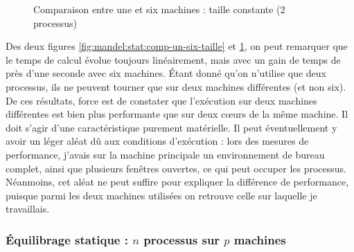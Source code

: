 \begin{figure}
  \centering


  \caption{Comparaison entre une et six machines : taille
    constante (2 processus)}
  \label{fig:mandel:stat:comp-un-six-prof}
\end{figure}

Des deux figures \ref{fig:mandel:stat:comp-un-six-taille} et
\ref{fig:mandel:stat:comp-un-six-prof}, on peut remarquer que le temps
de calcul évolue toujours linéairement, mais avec un gain de temps de
près d'une seconde avec six machines. Étant donné qu'on n'utilise que
deux processus, ils ne peuvent tourner que sur deux machines
différentes (et non six). De ces résultats, force est de constater que
l'exécution sur deux machines différentes est bien plus performante
que sur deux cœurs de la même machine. Il doit s'agir d'une
caractéristique purement matérielle. Il peut éventuellement y avoir un
léger aléat dû aux conditions d'exécution : lors des mesures de
performance, j'avais sur la machine principale un environnement de
bureau complet, ainsi que plusieurs fenêtres ouvertes, ce qui peut
occuper les processus. Néanmoins, cet aléat ne peut suffire pour
expliquer la différence de performance, puisque parmi les deux
machines utilisées on retrouve celle sur laquelle je travaillais.

\subsubsection{Équilibrage statique : $n$ processus sur $p$ machines}

